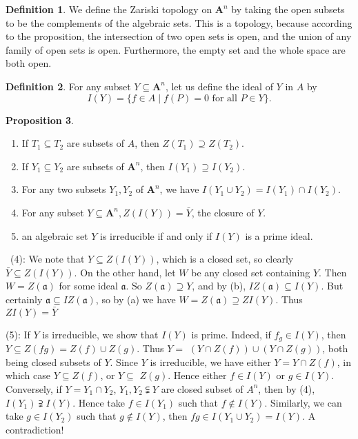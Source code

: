 \documentclass[12pt,a4paper]{book}
\newenvironment{prooff}{{\noindent\it\textcolor{cyan!40!black}{Proof}:}\,}{\par}
\newenvironment{enu}{\begin{enumerate}[(1)]}{\end{enumerate}}
\theoremstyle{definition}
\newtheorem{defn}{Definition}[section]
\newtheorem{prop}[defn]{Proposition}
\begin{document}
\begin{defn}
    We define the Zariski topology on $\mathbf{A}^n$ by taking the open subsets to be the complements of the algebraic sets. This is a topology, because according to the proposition, the intersection of two open sets is open, and the union of any family of open sets is open. Furthermore, the empty set and the whole space are both open.
\end{defn}
\begin{defn}
    For any subset $Y \subseteq \mathbf{A}^n$, let us define the ideal of $Y$ in $A$ by
    $$
        I(Y)=\{f \in A \mid f(P)=0 \text { for all } P \in Y\} .
    $$
\end{defn}
\begin{prop}
    \begin{enu}
        \item If $T_1 \subseteq T_2$ are subsets of $A$, then $Z\left(T_1\right) \supseteq Z\left(T_2\right)$.
        \item If $Y_1 \subseteq Y_2$ are subsets of $\mathbf{A}^n$, then $I\left(Y_1\right) \supseteq I\left(Y_2\right)$.
        \item For any two subsets $Y_1, Y_2$ of $\mathbf{A}^n$, we have $I\left(Y_1 \cup Y_2\right)=I\left(Y_1\right) \cap I\left(Y_2\right)$.
        \item For any subset $Y \subseteq \mathbf{A}^n, Z(I(Y))=\bar{Y}$, the closure of $Y$.
        \item an algebraic set $Y$ is irreducible if and only if $I(Y)$ is a prime ideal.
    \end{enu}
    \label{proposition:spec of algebraic set}
\end{prop}
\begin{prooff}
    (4): We note that $Y \subseteq Z(I(Y))$, which is a closed set, so clearly $\bar{Y} \subseteq Z(I(Y))$. On the other hand, let $W$ be any closed set containing $Y$. Then $W=Z(\mathfrak{a})$ for some ideal $\mathfrak{a}$. So $Z(\mathfrak{a}) \supseteq Y$, and by (b), $I Z(\mathfrak{a}) \subseteq I(Y)$. But certainly $\mathfrak{a} \subseteq I Z(\mathfrak{a})$, so by (a) we have $W=Z(\mathfrak{a}) \supseteq Z I(Y)$. Thus $Z I(Y)=\bar{Y}$

    (5): If $Y$ is irreducible, we show that $I(Y)$ is prime. Indeed, if $f_g \in I(Y)$, then $Y \subseteq Z(f g)=Z(f) \cup Z(g)$. Thus $Y=$ $(Y \cap Z(f)) \cup(Y \cap Z(g))$, both being closed subsets of $Y$. Since $Y$ is irreducible, we have either $Y=Y \cap Z(f)$, in which case $Y \subseteq Z(f)$, or $Y \subseteq$ $Z(g)$. Hence either $f \in I(Y)$ or $g \in I(Y)$.
    Conversely, if $Y=Y_1\cap Y_2$, $Y_1,Y_2 \subsetneqq Y$ are closed subset of $A^n$, then by (4), $I(Y_1)\supsetneqq  I(Y)$. Hence take $f\in I(Y_1)$ such that $f\notin I(Y)$. Similarly, we can take $g\in I(Y_2)$ such that $g\notin I(Y)$, then $fg\in I(Y_1\cup Y_2)=I(Y)$. A contradiction!
\end{prooff}
\end{document}
